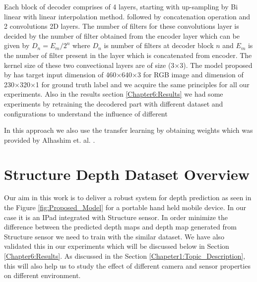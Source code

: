 Each block of decoder comprises of 4 layers, starting with up-sampling by Bi linear with linear interpolation method. followed by concatenation operation and 2 convolutions 2D layers. The number of filters for these convolutions layer is decided by the number of filter obtained from the encoder layer which can be given by \(D_n =  {E_m} / {2^n}\) where \(D_n\) is number of filters at decoder block \(n\) and \(E_m\) is the number of filter present in the layer which is concatenated from encoder. The kernel size of these two convectional layers are of size (3$\times$3). The model proposed by  \cite{Alhashim2018} has target input dimension of 460$\times$640$\times$3 for RGB image and  dimension of 230$\times$320$\times$1 for ground truth label and we acquire the same principles for all our experiments. Also in the results section \ref{Chapter6:Results} we had some experiments by retraining the decodered part with different dataset and configurations to understand the influence of different 

In this approach we also use the transfer learning by obtaining weights which was provided by Alhashim et. al. \cite{Alhashim2018}. 



\section{Structure Depth Dataset Overview} 
\label{Chapter4:Dataset} 

Our aim in this work is to deliver a robust system for depth prediction as seen in the Figure \ref{fig:Proposed_Model} for a portable hand held mobile device. In our case it is an IPad integrated with Structure sensor. In order minimize the difference between the predicted depth maps and depth map generated from Structure sensor we need to train with the similar dataset. We have also validated this in our experiments which will be discussed below in Section \ref{Chapter6:Results}. As discussed in the Section \ref{Chapeter1:Topic_Description}, this will also help us to study the effect of different camera and sensor properties on different environment.\\

